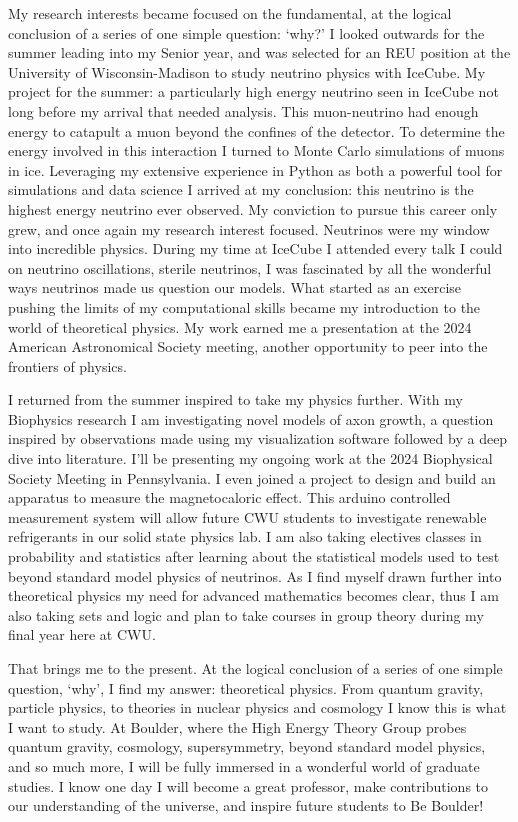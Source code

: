 \documentclass[a4paper, 12pt]{article}
\begin{document}
My research interests became focused on the fundamental, at the logical conclusion of a series of one simple question: `why?' I looked outwards for the summer leading into my Senior year, and was selected for an REU position at the University of Wisconsin-Madison to study neutrino physics with IceCube. My project for the summer: a particularly high energy neutrino seen in IceCube not long before my arrival that needed analysis. This muon-neutrino had enough energy to catapult a muon beyond the confines of the detector. To determine the energy involved in this interaction I turned to Monte Carlo simulations of muons in ice. Leveraging my extensive experience in Python as both a powerful tool for simulations and data science I arrived at my conclusion: this neutrino is the highest energy neutrino ever observed. My conviction to pursue this career only grew, and once again my research interest focused. Neutrinos were my window into incredible physics. During my time at IceCube I attended every talk I could on neutrino oscillations, sterile neutrinos, I was fascinated by all the wonderful ways neutrinos made us question our models. What started as an exercise pushing the limits of my computational skills became my introduction to the world of theoretical physics. My work earned me a presentation at the 2024 American Astronomical Society meeting, another opportunity to peer into the frontiers of physics.

I returned from the summer inspired to take my physics further. With my Biophysics research I am investigating novel models of axon growth, a question inspired by observations made using my visualization software followed by a deep dive into literature. I'll be presenting my ongoing work at the 2024 Biophysical Society Meeting in Pennsylvania. I even joined a project to design and build an apparatus to measure the magnetocaloric effect. This arduino controlled measurement system will allow future CWU students to investigate renewable refrigerants in our solid state physics lab. I am also taking electives classes in probability and statistics after learning about the statistical models used to test beyond standard model physics of neutrinos. As I find myself drawn further into theoretical physics my need for advanced mathematics becomes clear, thus I am also taking sets and logic and plan to take courses in group theory during my final year here at CWU.

That brings me to the present. At the logical conclusion of a series of one simple question, `why', I find my answer: theoretical physics. From quantum gravity, particle physics, to theories in nuclear physics and cosmology I know this is what I want to study. At Boulder, where the High Energy Theory Group probes quantum gravity, cosmology, supersymmetry, beyond standard model physics, and so much more, I will be fully immersed in a wonderful world of graduate studies. I know one day I will become a great professor, make contributions to our understanding of the universe, and inspire future students to Be Boulder!
\end{document}
